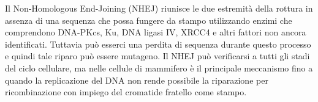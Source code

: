 \documentclass[11pt]{report}
\begin{document}
	Il Non-Homologous End-Joining (NHEJ) riunisce le due estremità della rottura in assenza di una sequenza che possa fungere da stampo utilizzando enzimi che comprendono DNA-PKcs, Ku, DNA ligasi IV, XRCC4 e altri fattori non ancora identificati. Tuttavia può esserci una perdita di sequenza durante questo processo e quindi tale riparo può essere mutageno. Il NHEJ può verificarsi a tutti gli stadi del ciclo cellulare, ma nelle cellule di mammifero è il principale meccanismo fino a quando la replicazione del DNA non rende possibile la riparazione per ricombinazione con impiego del cromatide fratello come stampo.\cite{mladenov2011induction}
	
	
	{\small }
\end{document}
